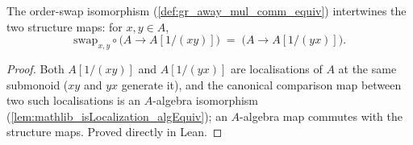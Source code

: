 \begin{lemma}

  \label{lem:gr_awayMulCommEquiv_comp_algebraMap}
  The order-swap isomorphism (\cref{def:gr_away_mul_comm_equiv}) intertwines the
  two structure maps: for \(x, y \in A\),
  \[
    \mathrm{swap}_{x,y} \circ \bigl(A \to A[1/(xy)]\bigr)
      \;=\; \bigl(A \to A[1/(yx)]\bigr).
  \]
\end{lemma}
\begin{proof}
  \leanok
  Both \(A[1/(xy)]\) and \(A[1/(yx)]\) are localisations of \(A\) at the same
  submonoid (\(xy\) and \(yx\) generate it), and the canonical comparison map
  between two such localisations is an \(A\)-algebra isomorphism
  (\cref{lem:mathlib_isLocalization_algEquiv}); an \(A\)-algebra map commutes with
  the structure maps. Proved directly in Lean.
\end{proof}

